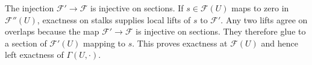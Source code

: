 The injection $\mathscr F'\to\mathscr F$ is injective on sections. If $s\in\mathscr F(U)$ maps to zero in $\mathscr F''(U)$, exactness on stalks supplies local lifts of $s$ to $\mathscr F'$. Any two lifts agree on overlaps because the map $\mathscr F'\to\mathscr F$ is injective on sections. They therefore glue to a section of $\mathscr F'(U)$ mapping to $s$. This proves exactness at $\mathscr F(U)$ and hence left exactness of $\Gamma(U,\cdot)$.
